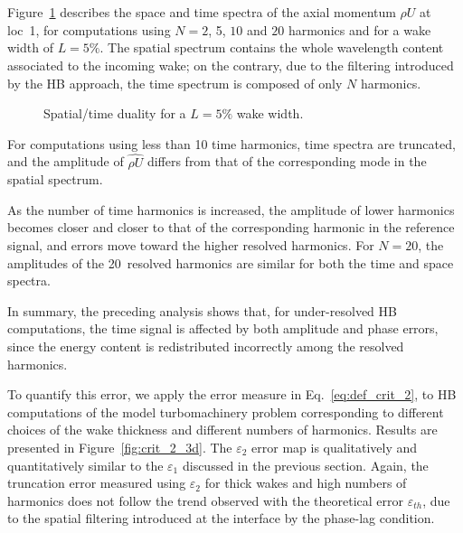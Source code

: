 Figure~\ref{fig:dualite_crit} describes the space and 
time spectra of the axial momentum $\widehat{\rho U}$ at loc~1, 
for computations using $N=2$, 5, $10$ and $20$ 
harmonics and for a wake width of $L=5\%$.
The spatial spectrum contains the whole wavelength 
content associated to the incoming wake; 
on the contrary, due to the filtering introduced 
by the HB approach, the time spectrum is composed of only $N$ harmonics.
\begin{figure}[htp]
\centering
{}
\caption{Spatial/time duality for a $L=5\%$ wake width.}
\label{fig:dualite_crit}
\end{figure}

For computations using less than 10 time harmonics, 
time spectra are truncated, and the amplitude of 
$\widehat{\rho U}$ differs from that of the corresponding mode in the spatial spectrum.

As the number of time harmonics is increased, 
the amplitude of lower harmonics becomes closer 
and closer to that of the corresponding harmonic 
in the reference signal, and errors move toward 
the higher resolved harmonics. For $N=20$, 
the amplitudes of the 20~resolved harmonics are 
similar for both the time and space spectra.

In summary, the preceding analysis shows that, 
for under-resolved HB computations, the time 
signal is affected by both amplitude and phase errors, 
since the energy content is redistributed incorrectly 
among the resolved harmonics.

To quantify this error, we apply the error measure 
in Eq.~\eqref{eq:def_crit_2},
to HB computations of the model turbomachinery 
problem corresponding to different choices 
of the wake thickness and different numbers of 
harmonics. Results are presented in Figure~\ref{fig:crit_2_3d}.
The $\varepsilon_2$ error map is qualitatively 
and quantitatively similar to the $\varepsilon_1$ 
discussed in the previous section. 
Again, the truncation error measured using $\varepsilon_2$ 
for thick wakes and high numbers of harmonics 
does not follow the trend observed with the 
theoretical error $\varepsilon_{th}$, 
due to the spatial filtering introduced at the 
interface by the phase-lag condition.

